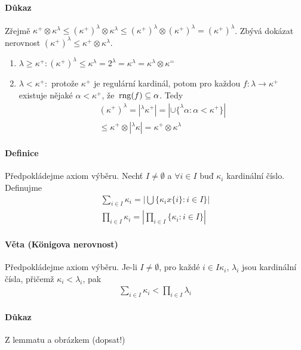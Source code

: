 \documentclass[a4paper,12pt,titlepage]{article}
\begin{document}
\paragraph{Důkaz}
Zřejmě $\kappa^+ \otimes \kappa^\lambda \le (\kappa^+)^\lambda \otimes
\kappa^\lambda \le (\kappa^+)^\lambda \otimes (\kappa^+)^\lambda =
(\kappa^+)^\lambda$. Zbývá dokázat nerovnost $(\kappa^+)^\lambda \le \kappa^+
\otimes \kappa^\lambda$.
\begin{enumerate}
	\item  $\lambda \ge \kappa^+: (\kappa^+)^\lambda \le \kappa^\lambda =
	2^\lambda = \kappa^\lambda = \kappa^\lambda \otimes \kappa^=$
	\item $\lambda < \kappa^+: $ protože $\kappa^+$ je regulární kardinál, potom
	pro každou $f: \lambda \to \kappa^+$ existuje nějaké $\alpha < \kappa^+$, že
	$\operatorname*{\,rng}(f) \subseteq \alpha$. Tedy 
	\begin{align}
		(\kappa^+)^\lambda = | ^\lambda \kappa^+| = | \cup \{ ^\lambda \alpha :
		\alpha < \kappa^+ \} | \\
		\le \kappa^+ \otimes | ^\lambda \kappa| = \kappa^+ \otimes
		\kappa^\lambda
	\end{align}
\end{enumerate}
\paragraph{Definice}
Předpokládejme axiom výběru. Nechť $I \neq \emptyset$ a $\forall i \in I$ buď
$\kappa_i$ kardinální číslo. Definujme 
\begin{align}
	\sum_{i\in I} \kappa_i = \left| \bigcup \{\kappa_i x \{i\}: i \in I
	\}\right| \\
	\prod_{i\in I} \kappa_i = \left| \prod_{i \in I} \{\kappa_i: i \in I\} \right |
\end{align}
\paragraph{Věta (Königova nerovnost)}
Předpokládejme axiom výběru. Je-li $I \neq \emptyset$, pro každé $i \in I
\kappa_i$, $\lambda_i$ jsou kardinální čísla, přičemž $\kappa_i <\lambda_i$, pak 
\begin{align}
	\sum_{i\in I} \kappa_i < \prod_{i\in I} \lambda_i
\end{align}
\paragraph{Důkaz}
Z lemmatu a obrázkem (dopsat!)
\end{document}
